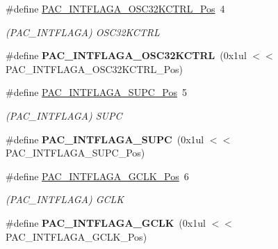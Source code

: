 \begin{DoxyCompactItemize}
\item 
\hypertarget{group___s_a_m_l21___p_a_c_ga98b1bb28cf160cc139d57a5371a2bb57}{}\#define \hyperlink{group___s_a_m_l21___p_a_c_ga98b1bb28cf160cc139d57a5371a2bb57}{P\+A\+C\+\_\+\+I\+N\+T\+F\+L\+A\+G\+A\+\_\+\+O\+S\+C32\+K\+C\+T\+R\+L\+\_\+\+Pos}~4\label{group___s_a_m_l21___p_a_c_ga98b1bb28cf160cc139d57a5371a2bb57}

\begin{DoxyCompactList}\small\item\em (P\+A\+C\+\_\+\+I\+N\+T\+F\+L\+A\+G\+A) O\+S\+C32\+K\+C\+T\+R\+L \end{DoxyCompactList}\item 
\hypertarget{group___s_a_m_l21___p_a_c_gaec195e885d795f4d29aa1ca2e64bbba1}{}\#define {\bfseries P\+A\+C\+\_\+\+I\+N\+T\+F\+L\+A\+G\+A\+\_\+\+O\+S\+C32\+K\+C\+T\+R\+L}~(0x1ul $<$$<$ P\+A\+C\+\_\+\+I\+N\+T\+F\+L\+A\+G\+A\+\_\+\+O\+S\+C32\+K\+C\+T\+R\+L\+\_\+\+Pos)\label{group___s_a_m_l21___p_a_c_gaec195e885d795f4d29aa1ca2e64bbba1}

\item 
\hypertarget{group___s_a_m_l21___p_a_c_ga3a76db3b81641575ae9d66ccd76f9b57}{}\#define \hyperlink{group___s_a_m_l21___p_a_c_ga3a76db3b81641575ae9d66ccd76f9b57}{P\+A\+C\+\_\+\+I\+N\+T\+F\+L\+A\+G\+A\+\_\+\+S\+U\+P\+C\+\_\+\+Pos}~5\label{group___s_a_m_l21___p_a_c_ga3a76db3b81641575ae9d66ccd76f9b57}

\begin{DoxyCompactList}\small\item\em (P\+A\+C\+\_\+\+I\+N\+T\+F\+L\+A\+G\+A) S\+U\+P\+C \end{DoxyCompactList}\item 
\hypertarget{group___s_a_m_l21___p_a_c_ga96d8fcde168624ac3da7f48e394016ed}{}\#define {\bfseries P\+A\+C\+\_\+\+I\+N\+T\+F\+L\+A\+G\+A\+\_\+\+S\+U\+P\+C}~(0x1ul $<$$<$ P\+A\+C\+\_\+\+I\+N\+T\+F\+L\+A\+G\+A\+\_\+\+S\+U\+P\+C\+\_\+\+Pos)\label{group___s_a_m_l21___p_a_c_ga96d8fcde168624ac3da7f48e394016ed}

\item 
\hypertarget{group___s_a_m_l21___p_a_c_ga79e2af224a5f7298a2780418863d8397}{}\#define \hyperlink{group___s_a_m_l21___p_a_c_ga79e2af224a5f7298a2780418863d8397}{P\+A\+C\+\_\+\+I\+N\+T\+F\+L\+A\+G\+A\+\_\+\+G\+C\+L\+K\+\_\+\+Pos}~6\label{group___s_a_m_l21___p_a_c_ga79e2af224a5f7298a2780418863d8397}

\begin{DoxyCompactList}\small\item\em (P\+A\+C\+\_\+\+I\+N\+T\+F\+L\+A\+G\+A) G\+C\+L\+K \end{DoxyCompactList}\item 
\hypertarget{group___s_a_m_l21___p_a_c_ga7108d21365c965176c3fa6752c7d35a7}{}\#define {\bfseries P\+A\+C\+\_\+\+I\+N\+T\+F\+L\+A\+G\+A\+\_\+\+G\+C\+L\+K}~(0x1ul $<$$<$ P\+A\+C\+\_\+\+I\+N\+T\+F\+L\+A\+G\+A\+\_\+\+G\+C\+L\+K\+\_\+\+Pos)\label{group___s_a_m_l21___p_a_c_ga7108d21365c965176c3fa6752c7d35a7}


\end{DoxyCompactItemize}
